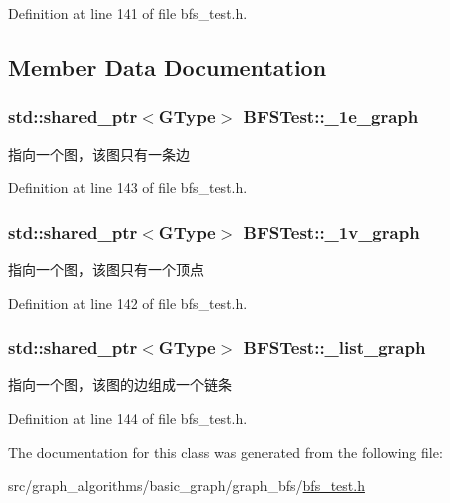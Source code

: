 Definition at line 141 of file bfs\+\_\+test.\+h.



\subsection{Member Data Documentation}
\hypertarget{class_b_f_s_test_a0158014634e67e6bee3f8f6b1e622ced}{}
\subsubsection[{\+\_\+1e\+\_\+graph}]{\setlength{\rightskip}{0pt plus 5cm}std\+::shared\+\_\+ptr$<${\bf G\+Type}$>$ B\+F\+S\+Test\+::\+\_\+1e\+\_\+graph\hspace{0.3cm}{\ttfamily [protected]}}\label{class_b_f_s_test_a0158014634e67e6bee3f8f6b1e622ced}
指向一个图，该图只有一条边 

Definition at line 143 of file bfs\+\_\+test.\+h.

\hypertarget{class_b_f_s_test_a0d7cdb7946902c8d93945a35a222b9d7}{}
\subsubsection[{\+\_\+1v\+\_\+graph}]{\setlength{\rightskip}{0pt plus 5cm}std\+::shared\+\_\+ptr$<${\bf G\+Type}$>$ B\+F\+S\+Test\+::\+\_\+1v\+\_\+graph\hspace{0.3cm}{\ttfamily [protected]}}\label{class_b_f_s_test_a0d7cdb7946902c8d93945a35a222b9d7}
指向一个图，该图只有一个顶点 

Definition at line 142 of file bfs\+\_\+test.\+h.

\hypertarget{class_b_f_s_test_aacf800be44976478c190b2acd338377f}{}
\subsubsection[{\+\_\+list\+\_\+graph}]{\setlength{\rightskip}{0pt plus 5cm}std\+::shared\+\_\+ptr$<${\bf G\+Type}$>$ B\+F\+S\+Test\+::\+\_\+list\+\_\+graph\hspace{0.3cm}{\ttfamily [protected]}}\label{class_b_f_s_test_aacf800be44976478c190b2acd338377f}
指向一个图，该图的边组成一个链条 

Definition at line 144 of file bfs\+\_\+test.\+h.



The documentation for this class was generated from the following file\+:\begin{DoxyCompactItemize}
\item 
src/graph\+\_\+algorithms/basic\+\_\+graph/graph\+\_\+bfs/\hyperlink{bfs__test_8h}{bfs\+\_\+test.\+h}\end{DoxyCompactItemize}
